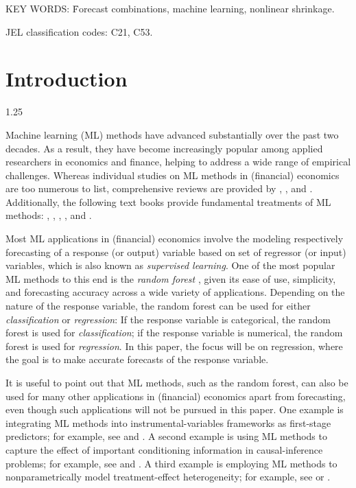 \documentclass[12pt]{article}
\numberwithin{equation}{section}
\theoremstyle{plain}
\begin{document}
\begin{tabbing}
\noindent  
KEY WORDS: \=  Forecast combinations, machine learning, nonlinear shrinkage.
\end{tabbing}

\noindent
JEL classification codes: C21, C53.
\vfill

\newpage

\section{Introduction}

\begin{spacing}{1.25}

Machine learning (ML) methods have advanced substantially over the past two decades. As a result, they have become increasingly popular among applied researchers in economics and finance, helping to address a wide range of empirical challenges. Whereas individual studies on ML methods in (financial) economics are too numerous to list, comprehensive reviews are provided by
\cite{varian2014big}, \cite{Sendhil:MLAppliedMetrics}, 
and \cite{athey:imbens:ml:2019}.
Additionally, the following text books provide fundamental treatments of ML methods:
\cite{hastie:tibshirani:freedman:2017},
\cite{dixon:halperin:bilokon:2020}, 
\cite{lopez:ml:book}, 
\cite{chan:ml:2022}, and
\cite{kellly:xiu:2023}.

Most ML applications in (financial) economics involve the modeling respectively forecasting of a response (or output) variable based on set of regressor (or input) variables, which is also known as {\em supervised learning}. One of the most popular ML methods to this end is the {\em random forest} \citep{breiman:2001}, given its ease of
use, simplicity, and forecasting accuracy across a wide variety
of applications. 
Depending on the nature of the response variable, 
the random forest can be used for either  {\em
  classification} or {\em regression}: If the response variable is
categorical, the random forest is used for
{\em classification}; if the response variable is numerical, the random forest is used for {\em regression}. In this paper, the focus will be on regression, where the goal is to make accurate forecasts of the response variable.

It is useful to point out that ML methods, such as the random forest, can also be used for many other applications in (financial) economics apart from forecasting, even though such applications will not be pursued in this paper. One example is integrating ML methods into instrumental-variables frameworks as first-stage predictors; for example, see \cite{BellChenChernHans:nonGauss} and \cite{hansenkobzur}.  A second example is using ML methods to capture the effect of important conditioning information in causal-inference problems; for example, see \cite{BelloniChernozhukovHansen2011} and \cite{chernozhukov2018}. A third example is employing ML methods to nonparametrically model treatment-effect heterogeneity; for example, see \cite{athey:tibshirani:wager:2019} or \cite{hansen:kozbur:misra}. 


\end{spacing}
\end{document}
